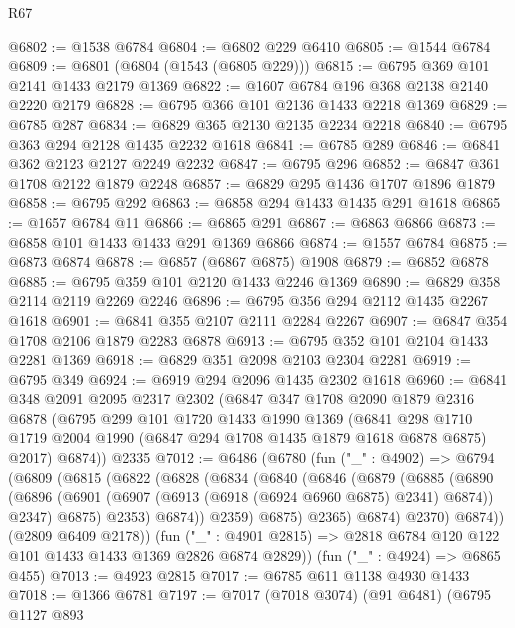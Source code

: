 \begin{lexlean}{R67}
\begin{coremodule}
@6802 := @1538 @6784
@6804 := @6802 @229 @6410
@6805 := @1544 @6784
@6809 := @6801 (@6804 (@1543 (@6805 @229)))
@6815 := @6795 @369 @101 @2141 @1433 @2179 @1369
@6822 := @1607 @6784 @196 @368 @2138 @2140 @2220 @2179
@6828 := @6795 @366 @101 @2136 @1433 @2218 @1369
@6829 := @6785 @287
@6834 := @6829 @365 @2130 @2135 @2234 @2218
@6840 := @6795 @363 @294 @2128 @1435 @2232 @1618
@6841 := @6785 @289
@6846 := @6841 @362 @2123 @2127 @2249 @2232
@6847 := @6795 @296
@6852 := @6847 @361 @1708 @2122 @1879 @2248
@6857 := @6829 @295 @1436 @1707 @1896 @1879
@6858 := @6795 @292
@6863 := @6858 @294 @1433 @1435 @291 @1618
@6865 := @1657 @6784 @11
@6866 := @6865 @291
@6867 := @6863 @6866
@6873 := @6858 @101 @1433 @1433 @291 @1369 @6866
@6874 := @1557 @6784
@6875 := @6873 @6874
@6878 := @6857 (@6867 @6875) @1908
@6879 := @6852 @6878
@6885 := @6795 @359 @101 @2120 @1433 @2246 @1369
@6890 := @6829 @358 @2114 @2119 @2269 @2246
@6896 := @6795 @356 @294 @2112 @1435 @2267 @1618
@6901 := @6841 @355 @2107 @2111 @2284 @2267
@6907 := @6847 @354 @1708 @2106 @1879 @2283 @6878
@6913 := @6795 @352 @101 @2104 @1433 @2281 @1369
@6918 := @6829 @351 @2098 @2103 @2304 @2281
@6919 := @6795 @349
@6924 := @6919 @294 @2096 @1435 @2302 @1618
@6960 := @6841
    @348
    @2091
    @2095
    @2317
    @2302
    (@6847
      @347
      @1708
      @2090
      @1879
      @2316
      @6878
      (@6795
        @299
        @101
        @1720
        @1433
        @1990
        @1369
        (@6841 @298 @1710 @1719 @2004 @1990 (@6847 @294 @1708 @1435 @1879 @1618 @6878 @6875) @2017)
        @6874))
    @2335
@7012 := @6486
    (@6780
      (fun ("_" : @4902) =>
      @6794
        (@6809
          (@6815
            (@6822
              (@6828
                (@6834
                  (@6840
                    (@6846
                      (@6879
                        (@6885
                          (@6890
                            (@6896
                              (@6901 (@6907 (@6913 (@6918 (@6924 @6960 @6875) @2341) @6874)) @2347)
                              @6875)
                            @2353)
                          @6874))
                      @2359)
                    @6875)
                  @2365)
                @6874)
              @2370)
            @6874))
        (@2809 @6409 @2178))
      (fun ("_" : @4901 @2815) => @2818 @6784 @120 @122 @101 @1433 @1433 @1369 @2826 @6874 @2829))
    (fun ("_" : @4924) => @6865 @455)
@7013 := @4923 @2815
@7017 := @6785 @611 @1138 @4930 @1433
@7018 := @1366 @6781
@7197 := @7017
    (@7018 @3074)
    (@91 @6481)
    (@6795
      @1127
      @893

\end{coremodule}
\end{lexlean}
